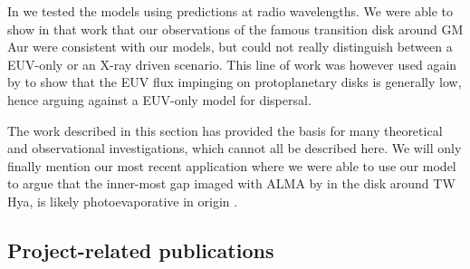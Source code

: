 \documentclass[10pt,fleqn,twoside]{article}
\begin{document}
In 
\citet{2013MNRAS.434.3378O}
we tested the models using
predictions at radio wavelengths. We were able to show in that work that our
observations of the famous transition disk around GM Aur were
consistent with our models, but could not really distinguish between
a EUV-only or an X-ray driven scenario. This line of work was however
used again by 
\citet{2014ApJ...795....1P}
to show that the EUV flux
impinging on protoplanetary disks is generally low, hence arguing
against a EUV-only model for dispersal. 

The work described in this section has provided the basis for many theoretical
and observational investigations, which cannot all be described
here. We will only finally mention our most recent application where
we were able to use our model to argue that the inner-most gap imaged
with ALMA by 
\citet{2016ApJ...820L..40A}
in the disk around TW Hya, is
likely photoevaporative in origin 
\citep{2017MNRAS.464L..95E}.


\subsection{Project-related publications}


\end{document}
